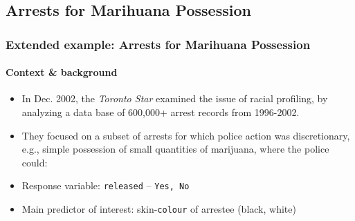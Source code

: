 

%





\subsection[Arrests]{Arrests for Marihuana Possession}

\begin{frame}
	\frametitle{Extended example: Arrests for Marihuana Possession}
	\framesubtitle{Context \& background}
  \begin{itemize}
  \item In Dec. 2002, the \emph{Toronto Star} examined the issue of \alert{racial profiling}, by analyzing
  a data base of 600,000+ arrest records from 1996-2002.
  
  \item They focused on a subset of arrests for which police action was \alert{discretionary}, e.g.,
  simple possession of small quantities of marijuana, where the police could:

  \item \alert{Response} variable: \texttt{released} -- \texttt{Yes, No}

  \item Main \alert{predictor} of interest: skin-\texttt{colour} of arrestee (black, white)
  \end{itemize}  
\end{frame}


